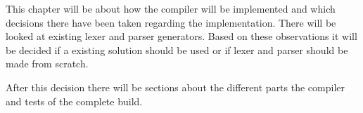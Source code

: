 This chapter will be about how the compiler will be implemented and which decisions there have been taken regarding the implementation. There will be looked at existing lexer and parser generators. Based on these observations it will be decided if a existing solution should be used or if lexer and parser should be made from scratch.

After this decision there will be sections about the different parts the compiler and tests of the complete build.